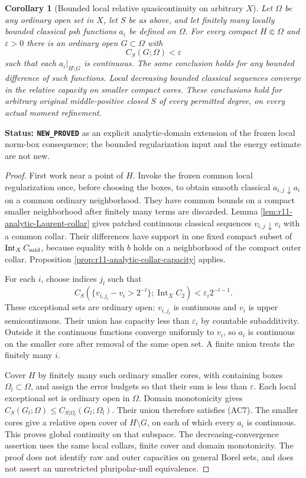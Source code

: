 \documentclass[11pt,a4paper]{article}
\numberwithin{equation}{section}
\newtheorem{corollary}[theorem]{Corollary}
\theoremstyle{definition}
\theoremstyle{remark}
\begin{document}
\begin{corollary}[Bounded local relative quasicontinuity on arbitrary $X$]
\label{cor:r11-analytic-bounded-relative-QC}
Let $\Omega$ be any ordinary open set in $X$, let $S$ be as above,
and let finitely many locally bounded classical psh functions $a_i$
be defined on $\Omega$.  For every compact $H\Subset\Omega$ and
$\varepsilon>0$ there is an ordinary open $G\subset\Omega$ with
\[
                   C_S(G;\Omega)<\varepsilon
 \tag{AC7}
\]
such that each $a_i|_{H\setminus G}$ is continuous.
The same conclusion holds for any bounded difference of such
functions.  Local decreasing bounded classical sequences converge
in the relative capacity on smaller compact cores.  These conclusions
hold for arbitrary original middle-positive closed $S$ of every
permitted degree, on every actual moment refinement.
\end{corollary}

\noindent\textbf{Status: \texttt{NEW\_PROVED}} as an explicit
analytic-domain extension of the frozen local norm-box consequence;
the bounded regularization input and the energy estimate are not new.

\begin{proof}
First work near a point of $H$.  Invoke the frozen common local
regularization once, before choosing the boxes, to obtain smooth
classical $a_{i,j}\downarrow a_i$ on a common ordinary neighborhood.
They have common bounds on a compact smaller neighborhood after
finitely many terms are discarded.  Lemma
\ref{lem:r11-analytic-Laurent-collar} gives patched continuous
classical sequences $v_{i,j}\downarrow v_i$ with a common collar.
Their differences have support in one fixed compact subset of
$\operatorname{Int}_X C_{\rm mid}$, because equality with $b$ holds
on a neighborhood of the compact outer collar.  Proposition
\ref{prop:r11-analytic-collar-capacity} applies.

For each $i$, choose indices $j_l$ such that
\[
 C_S(\{v_{i,j_l}-v_i>2^{-l}\};\operatorname{Int}_X C_2)
                                        <\varepsilon_i2^{-l-1}.
\]
These exceptional sets are ordinary open: $v_{i,j_l}$ is continuous
and $v_i$ is upper semicontinuous.  Their union has capacity less
than $\varepsilon_i$ by countable subadditivity.  Outside it the
continuous functions converge uniformly to $v_i$, so $a_i$ is
continuous on the smaller core after removal of the same open set.
A finite union treats the finitely many $i$.

Cover $H$ by finitely many such ordinary smaller cores, with containing
boxes $\Omega_l\subset\Omega$, and assign the error budgets so that
their sum is less than $\varepsilon$.  Each local exceptional set is
ordinary open in $\Omega$.  Domain monotonicity gives
$C_S(G_l;\Omega)\le C_{S|\Omega_l}(G_l;\Omega_l)$.
Their union therefore satisfies (AC7).  The smaller cores give a
relative open cover of $H\setminus G$, on each of which every $a_i$
is continuous.  This proves global continuity on that subspace.
The decreasing-convergence assertion uses the same local collars,
finite cover and domain monotonicity.  The proof does not identify
raw and outer capacities on general Borel sets, and does not assert
an unrestricted pluripolar-null equivalence.
\end{proof}
\end{document}
